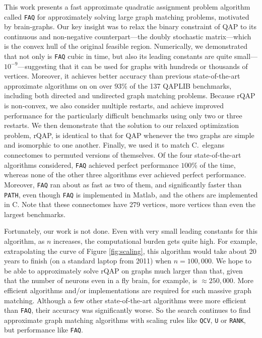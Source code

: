 \documentclass[11pt]{article}
\newcommand{\FAQ}{\texttt{FAQ} }
\begin{document}
This work presents a fast approximate quadratic assignment problem algorithm called \FAQ for approximately solving large graph matching problems, motivated by brain-graphs.  Our key insight was to relax the binary constraint of QAP to its continuous and non-negative counterpart---the doubly stochastic matrix---which is the convex hull of the original feasible region.  
Numerically, we demonstrated that not only is \FAQ cubic in time, but also its leading constants are quite small---$10^{-9}$---suggesting that it can be used for graphs with hundreds or thousands of vertices.  
Moreover, it achieves better accuracy than previous state-of-the-art approximate algorithms on on over $93\%$ of the 137 QAPLIB benchmarks, including both directed and undirected graph matching problems.  Because rQAP is non-convex, we also consider multiple restarts, and achieve improved performance for the particularly difficult benchmarks using only two or three restarts.  We then demonstrate that the solution to our relaxed optimization problem, rQAP, is identical to that for QAP whenever the two graphs are simple and isomorphic to one another.  Finally, we used it to match C.~elegans connectomes to permuted versions of themselves. Of the four state-of-the-art algorithms considered, \FAQ achieved perfect performance $100\%$ of the time, whereas none of the other three algorithms ever achieved perfect performance.  Moreover, \FAQ ran about as fast as two of them, and significantly faster than \texttt{PATH}, even though \FAQ is implemented in Matlab, and the others are implemented in C.  Note that these connectomes have 279 vertices, more vertices than even the largest benchmarks. 


Fortunately, our work is not done. Even with very small leading constants for this algorithm, as $n$ increases, the computational burden gets quite high.  For example, extrapolating the curve of Figure \ref{fig:scaling}, this algorithm would take about 20 years to finish (on a standard laptop from 2011) when $n=100,000$.  We hope to be able to approximately solve rQAP on graphs much larger than that, given that the number of neurons even in a fly brain, for example, is $\approx 250,000$.  More efficient algorithms and/or implementations are required for such massive graph matching. Although a few other state-of-the-art algorithms were more efficient than \texttt{FAQ}, their accuracy was significantly worse.  So the search continues to find approximate graph matching algorithms with scaling rules like \texttt{QCV}, \texttt{U} or \texttt{RANK}, but performance like \texttt{FAQ}.
\end{document}

